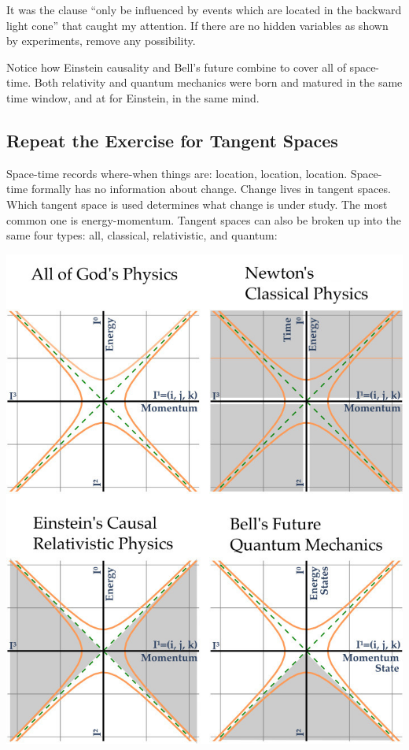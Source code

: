 It was the clause ``only be influenced by events which are located in
the backward light cone'' that caught my attention. If there are no
hidden variables as shown by experiments, remove any possibility.

Notice how Einstein causality and Bell's future combine to cover all of
space-time. Both relativity and quantum mechanics were born and matured
in the same time window, and at for Einstein, in the same mind.

\hypertarget{repeat-the-exercise-for-tangent-spaces}{%
\subsection{Repeat the Exercise for Tangent
Spaces}\label{repeat-the-exercise-for-tangent-spaces}}

Space-time records where-when things are: location, location, location.
Space-time formally has no information about change. Change lives in
tangent spaces. Which tangent space is used determines what change is
under study. The most common one is energy-momentum. Tangent spaces can
also be broken up into the same four types: all, classical,
relativistic, and quantum:

\includegraphics{../images/QM/BellsFuture/Bells_future_EP.jpg}

